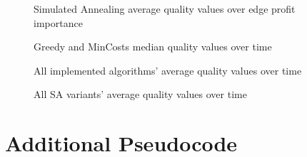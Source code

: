 \begin{figure}[H]
	\centering
	
	\caption{Simulated Annealing average quality values over edge profit importance}
	\label{fig:SAQualityProfitAvg}
\end{figure}






\begin{figure}[H]
	\centering
	
	\caption{Greedy and MinCosts median quality values over time}
	\label{fig:AllGreedyMinCost}
\end{figure}



\begin{figure}[H]
	\centering
	
	\caption{All implemented algorithms' average quality values over time}
	\label{fig:AllAverage}
\end{figure}



\begin{figure}[H]
	\centering
	
	\caption{All SA variants' average quality values over time}
	\label{fig:AllSAAverage}
\end{figure}



















\chapter{Additional Pseudocode}


